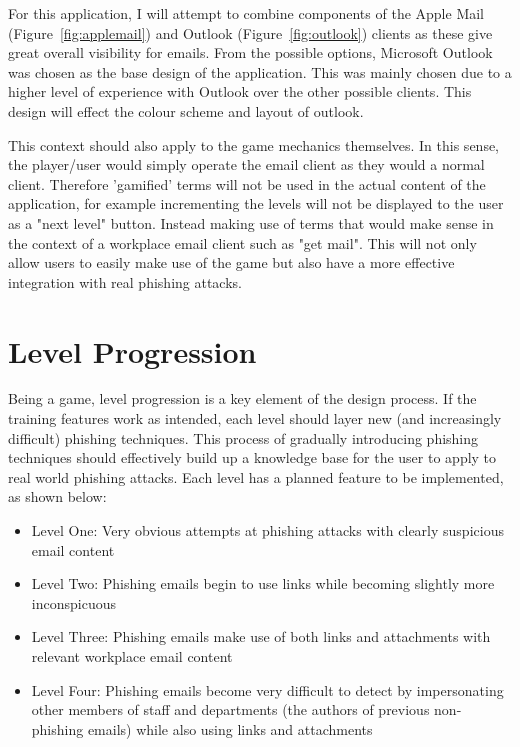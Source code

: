\documentclass{l4proj}
\begin{document}
For this application, I will attempt to combine components of the Apple Mail (Figure~\ref{fig:applemail}) and Outlook (Figure~\ref{fig:outlook}) clients as these give great overall visibility for emails. From the possible options, Microsoft Outlook was chosen as the base design of the application. This was mainly chosen due to a higher level of experience with Outlook over the other possible clients. This design will effect the colour scheme and layout of outlook.

This context should also apply to the game mechanics themselves. In this sense, the player/user would simply operate the email client as they would a normal client. Therefore 'gamified' terms will not be used in the actual content of the application, for example incrementing the levels will not be displayed to the user as a "next level" button. Instead making use of terms that would make sense in the context of a workplace email client such as "get mail". This will not only allow users to easily make use of the game but also have a more effective integration with real phishing attacks.

\section{Level Progression}
Being a game, level progression is a key element of the design process. If the training features work as intended, each level should layer new (and increasingly difficult) phishing techniques. This process of gradually introducing phishing techniques should effectively build up a knowledge base for the user to apply to real world phishing attacks. Each level has a planned feature to be implemented, as shown below:
\begin{itemize}
    \item Level One: Very obvious attempts at phishing attacks with clearly suspicious email content
    \item Level Two: Phishing emails begin to use links while becoming slightly more inconspicuous 
    \item Level Three: Phishing emails make use of both links and attachments with relevant workplace email content
    \item Level Four: Phishing emails become very difficult to detect by impersonating other members of staff and departments (the authors of previous non-phishing emails) while also using links and attachments
\end{itemize}
\end{document}
